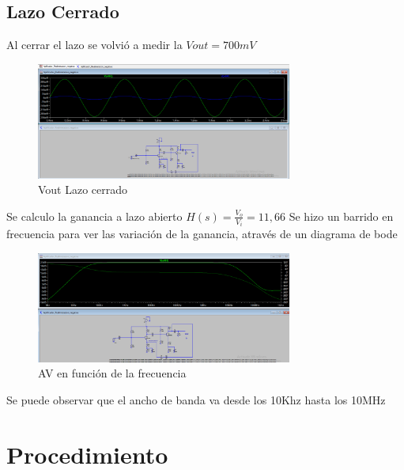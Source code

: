 \documentclass[12pt, letterpaper]{article}
\begin{document}
\subsection{Lazo Cerrado}
Al cerrar el lazo se volvió a medir la $Vout=700mV$
\begin{figure}[h!]
	\centering
	\includegraphics[width=0.75\textwidth]{Imagenes/Avf.png}
	\caption{Vout Lazo cerrado}
	\label{fig:4}
\end{figure}
Se calculo la ganancia a lazo abierto $H(s)=\frac{V_o}{V_i} = 11,66$
Se hizo un barrido en frecuencia para ver las variación de la ganancia, através de un diagrama de bode 
\begin{figure}[h!]
	\centering
	\includegraphics[width=0.75\textwidth]{Imagenes/lazoCerrado.png}
	\caption{AV en función de la frecuencia}
	\label{fig:4}
\end{figure}
Se puede observar que el ancho de banda va desde los 10Khz hasta los 10MHz





\section{Procedimiento}
\end{document}

